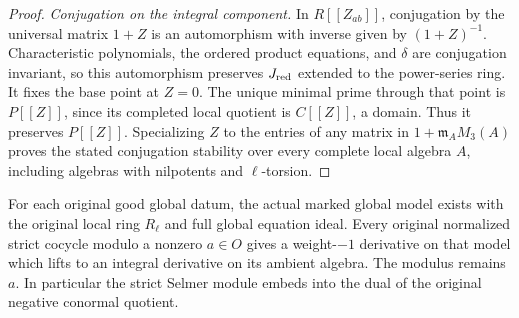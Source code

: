 \begin{proof}
\emph{Conjugation on the integral component.}
In $R[[Z_{ab}]]$, conjugation by the universal matrix $1+Z$ is an
automorphism with inverse given by $(1+Z)^{-1}$.  Characteristic
polynomials, the ordered product equations, and $\delta$ are
conjugation invariant, so this automorphism preserves $J_{\rm red}$
extended to the power-series ring.  It fixes the base point at $Z=0$.
The unique minimal prime through that point is $P[[Z]]$, since its
completed local quotient is $C[[Z]]$, a domain.  Thus it preserves
$P[[Z]]$.  Specializing $Z$ to the entries of any matrix in
$1+\mathfrak m_A M_3(A)$ proves the stated conjugation stability
over every complete local algebra $A$, including algebras with
nilpotents and $\ell$-torsion.
\end{proof}

\begin{theorem}
\label{thm:support-actual-integral-lifting}
For each original good global datum, the actual marked global model
exists with the original local ring $R_\ell$ and full global
equation ideal.  Every original normalized strict cocycle modulo a
nonzero $a\in O$ gives a weight-$-1$ derivative on that model which
lifts to an integral derivative on its ambient algebra.  The modulus
remains $a$.  In particular the strict Selmer module embeds into
the dual of the original negative conormal quotient.
\end{theorem}


